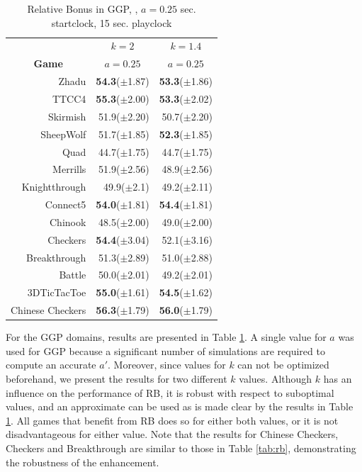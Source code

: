 \documentclass{ecai2014}
\begin{document}
\begin{table}
{\caption{Relative Bonus in GGP, {}, $a = 0.25$  sec. startclock, 15 sec. playclock} \label{tab:rb_ggp}}
\begin{center}
\begin{tabular}{rrr}
\hline
& \multicolumn{1}{c}{\textbf{$k = 2$}} & \multicolumn{1}{c}{\textbf{$k = 1.4$}} \\
\cline{1-3}
\multicolumn{1}{c|}{\rule{0pt}{12pt}\textbf{Game}} & \multicolumn{1}{c}{\textbf{$a = 0.25$}} & \multicolumn{1}{c}{\textbf{$a = 0.25$}} \\ \hline
\multicolumn{1}{r|}{Zhadu} 				&{\bf{54.3}}($\pm$1.87)	& {\bf{53.3}}($\pm$1.86) \\
\multicolumn{1}{r|}{TTCC4} 				&{\bf{55.3}}($\pm$2.00)	& {\bf{53.3}}($\pm$2.02) \\
\multicolumn{1}{r|}{Skirmish} 			&51.9($\pm$2.20)		& 50.7($\pm$2.20) \\
\multicolumn{1}{r|}{SheepWolf} 			&51.7($\pm$1.85)		& {\bf{52.3}}($\pm$1.85) \\
\multicolumn{1}{r|}{Quad} 				&44.7($\pm$1.75)		& 44.7($\pm$1.75) \\
\multicolumn{1}{r|}{Merrills} 			&51.9($\pm$2.56)		& 48.9($\pm$2.56) \\
\multicolumn{1}{r|}{Knightthrough}		&49.9($\pm$2.1)		& 49.2($\pm$2.11) \\
\multicolumn{1}{r|}{Connect5} 			&{\bf{54.0}}($\pm$1.81)	& {\bf{54.4}}($\pm$1.81) \\
\multicolumn{1}{r|}{Chinook} 			&48.5($\pm$2.00)		& 49.0($\pm$2.00) \\
\multicolumn{1}{r|}{Checkers} 			&{\bf{54.4}}($\pm$3.04)	& 52.1($\pm$3.16) \\
\multicolumn{1}{r|}{Breakthrough}		&51.3($\pm$2.89)		& 51.0($\pm$2.88) \\
\multicolumn{1}{r|}{Battle}				&50.0($\pm$2.01)		& 49.2($\pm$2.01) \\
\multicolumn{1}{r|}{3DTicTacToe}		&{\bf{55.0}}($\pm$1.61)	& {\bf{54.5}}($\pm$1.62) \\
\multicolumn{1}{r|}{Chinese Checkers}	&{\bf{56.3}}($\pm$1.79)	& {\bf{56.0}}($\pm$1.79) \\
\hline
\end{tabular}
\end{center}
\end{table}

For the GGP domains, results are presented in Table \ref{tab:rb_ggp}. A single value for $a$ was used for GGP because a significant number of simulations are required to compute an accurate $a'$. Moreover, since values for $k$ can not be optimized beforehand, we present the results for two different $k$ values. Although $k$ has an influence on the performance of RB, it is robust with respect to suboptimal values, and an approximate can be used as is made clear by the results in Table \ref{tab:rb_ggp}. All games that benefit from RB does so for either both values, or it is not disadvantageous for either value. Note that the results for Chinese Checkers, Checkers and Breakthrough are similar to those in Table \ref{tab:rb}, demonstrating the robustness of the enhancement.
\end{document}

